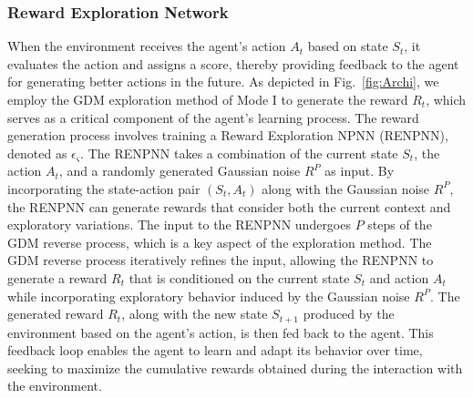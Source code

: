 \documentclass[comsoc,journal]{IEEEtran}
\begin{document}
\subsubsection{Reward Exploration Network}
When the environment receives the agent's action $A_t$ based on state $S_t$, it evaluates the action and assigns a score, thereby providing feedback to the agent for generating better actions in the future. As depicted in Fig.~\ref{fig:Archi}, we employ the GDM exploration method of Mode I to generate the reward $R_t$, which serves as a critical component of the agent's learning process. The reward generation process involves training a Reward Exploration NPNN (RENPNN), denoted as $\epsilon_{\varsigma}$. The RENPNN takes a combination of the current state $S_t$, the action $A_t$, and a randomly generated Gaussian noise $R^P$ as input. By incorporating the state-action pair $(S_t, A_t)$ along with the Gaussian noise $R^P$, the RENPNN can generate rewards that consider both the current context and exploratory variations. The input to the RENPNN undergoes $P$ steps of the GDM reverse process, which is a key aspect of the exploration method. The GDM reverse process iteratively refines the input, allowing the RENPNN to generate a reward $R_t$ that is conditioned on the current state $S_t$ and action $A_t$ while incorporating exploratory behavior induced by the Gaussian noise $R^P$. The generated reward $R_t$, along with the new state $S_{t+1}$ produced by the environment based on the agent's action, is then fed back to the agent. This feedback loop enables the agent to learn and adapt its behavior over time, seeking to maximize the cumulative rewards obtained during the interaction with the environment.
\end{document}
